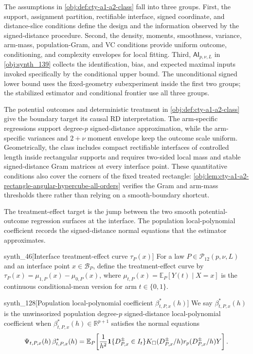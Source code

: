 The assumptions in \cref{obj:def:cty-a1-a2-class} fall into three groups. First, the support, assignment partition, rectifiable interface, signed coordinate, and distance-slice conditions define the design and the information observed by the signed-distance procedure. Second, the density, moments, smoothness, variance, arm-mass, population-Gram, and VC conditions provide uniform outcome, conditioning, and complexity envelopes for local fitting. Third, \(\mathsf{AI}_{p,\nu,L}\) in \cref{obj:synth_139} collects the identification, bias, and expected maximal inputs invoked specifically by the conditional upper bound. The unconditional signed lower bound uses the fixed-geometry subexperiment inside the first two groups; the stabilized estimator and conditional frontier use all three groups.

The potential outcomes  and deterministic treatment  in \cref{obj:def:cty-a1-a2-class} give the boundary target its causal RD interpretation. The arm-specific regressions  support degree-\(p\) signed-distance approximation, while the arm-specific variances  and \(2+\nu\) moment envelope keep the outcome scale uniform. Geometrically, the class includes compact rectifiable interfaces of controlled length inside rectangular supports and requires two-sided local mass and stable signed-distance Gram matrices at every interface point. These quantitative conditions also cover the corners of the fixed treated rectangle: \cref{obj:lem:cty-a1-a2-rectangle-angular-hypercube-all-orders} verifies the Gram and arm-mass thresholds there rather than relying on a smooth-boundary shortcut.

The treatment-effect target is the jump between the two smooth potential-outcome regression surfaces at the interface. The population local-polynomial coefficient records the signed-distance normal equations that the estimator approximates.

\begin{definitionv}{synth_46}[Interface treatment-effect curve $\tau_P(x)$]
For a law $P\in\mathcal P_{12}(p,\nu,L)$ and an interface point $x\in\mathcal B_P$, define the treatment-effect curve by $\tau_P(x)=\mu_{1,P}(x)-\mu_{0,P}(x)$, where $\mu_{t,P}(x)=\mathbb E_P[Y(t)\mid X=x]$ is the continuous conditional-mean version for arm $t\in\{0,1\}$.
\end{definitionv}

\begin{definitionv}{synth_128}[Population local-polynomial coefficient $\beta^*_{t,P,x}(h)$]
We say $\beta^*_{t,P,x}(h)$ is the unwinsorized population degree-$p$ signed-distance local-polynomial coefficient when $\beta^*_{t,P,x}(h)\in\mathbb R^{p+1}$ satisfies the normal equations \[\Psi_{t,P,x}(h)\,\beta^*_{t,P,x}(h)=\mathbb E_P\!\left[{1\over h^2}\mathbf 1\{D^{\pm}_{P,x}\in I_t\}K_\square(D^{\pm}_{P,x}/h)r_p(D^{\pm}_{P,x}/h)Y\right].\]
\end{definitionv}

